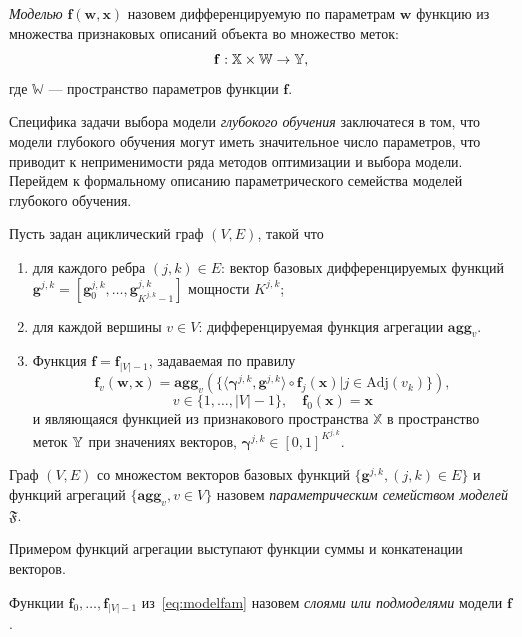 \begin{defin}
\textit{Моделью} $\mathbf{f}(\mathbf{w}, \mathbf{x})$ назовем дифференцируемую по параметрам $\mathbf{w}$ функцию из множества признаковых описаний объекта во множество меток:
\[
    \mathbf{f}: \mathbb{X} \times \mathbb{W} \to \mathbb{Y},
\] 
где $\mathbb{W}$ --- пространство параметров функции $\mathbf{f}$.
\end{defin}
Специфика задачи  выбора модели \textit{глубокого обучения} заключатеся в том, что модели глубокого обучения могут иметь значительное число параметров, что приводит к неприменимости ряда методов оптимизации и выбора модели. 
Перейдем к формальному описанию параметрического семейства моделей глубокого обучения. 
\begin{defin}
Пусть задан ациклический граф $(V,E)$, такой что 
\begin{enumerate}
\item для каждого ребра $(j,k) \in E$: вектор базовых дифференцируемых функций  $\mathbf{g}^{j,k} = [\mathbf{g}^{j,k}_0, \dots, \mathbf{g}^{j,k}_{K^{j,k}-1}]$  мощности $K^{j,k}$;
\item для каждой вершины $v \in V$: дифференцируемая функция агрегации $\textbf{agg}_v$.
\item Функция $\mathbf{f} = \mathbf{f}_{|V|-1}$, задаваемая по правилу 
\begin{equation}
\label{eq:modelfam}
    \mathbf{f}_{v}(\mathbf{w}, \mathbf{x}) = \textbf{agg}_{v}\left(\{ \langle \boldsymbol{\gamma}^{j,k}, \mathbf{g}^{j,k} \rangle \circ  \mathbf{f}_j(\mathbf{x})| j \in \text{Adj}(v_k)\}\right), 
\end{equation}
\[
v \in \{1,\dots,|V|-1\}, \quad \mathbf{f}_0(\mathbf{x}) = \mathbf{x}
\]
и являющаяся функцией из признакового пространства $\mathbb{X}$ в пространство меток $\mathbb{Y}$ при значениях векторов, $\boldsymbol{\gamma}^{j,k} \in [0,1]^{K^{j,k}}$.
\end{enumerate}

Граф $(V, E)$ со множестом векторов базовых функций $\{\mathbf{g}^{j,k}, (j,k) \in E\}$ и функций агрегаций $\{ \textbf{agg}_v, {v \in V}\}$ назовем \textit{параметрическим семейством моделей} $\mathfrak{F}$.
\end{defin}

Примером функций агрегации выступают функции суммы и конкатенации векторов.

\begin{defin}
Функции $\mathbf{f}_0, \dots, \mathbf{f}_{|V|-1}$ из~\eqref{eq:modelfam} назовем \textit{слоями или подмоделями} модели $\mathbf{f}$.
\end{defin}

